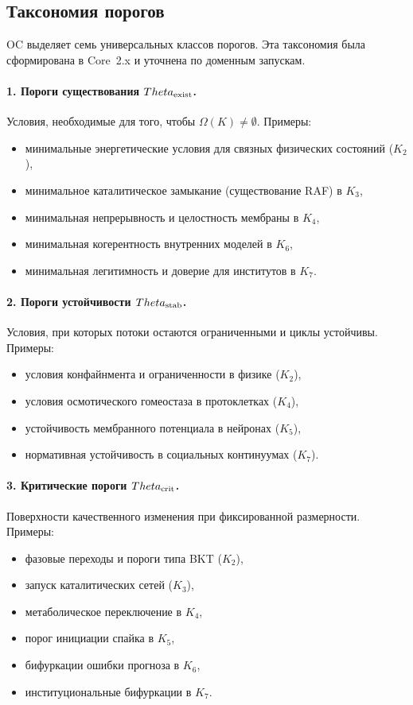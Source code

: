 \subsection{Таксономия порогов}

OC выделяет семь универсальных классов порогов. Эта таксономия была
сформирована в Core~2.x и уточнена по доменным запускам.

\paragraph{1. Пороги существования \(\Theta_{\rm exist}\).}
Условия, необходимые для того, чтобы \(\Omega(K)\neq\emptyset\).
Примеры:
\begin{itemize}
    \item минимальные энергетические условия для связных физических состояний (\(K_2\)),
    \item минимальное каталитическое замыкание (существование RAF) в \(K_3\),
    \item минимальная непрерывность и целостность мембраны в \(K_4\),
    \item минимальная когерентность внутренних моделей в \(K_6\),
    \item минимальная легитимность и доверие для институтов в \(K_7\).
\end{itemize}

\paragraph{2. Пороги устойчивости \(\Theta_{\rm stab}\).}
Условия, при которых потоки остаются ограниченными и циклы устойчивы.
Примеры:
\begin{itemize}
    \item условия конфайнмента и ограниченности в физике (\(K_2\)),
    \item условия осмотического гомеостаза в протоклетках (\(K_4\)),
    \item устойчивость мембранного потенциала в нейронах (\(K_5\)),
    \item нормативная устойчивость в социальных континуумах (\(K_7\)).
\end{itemize}

\paragraph{3. Критические пороги \(\Theta_{\rm crit}\).}
Поверхности качественного изменения при фиксированной размерности.
Примеры:
\begin{itemize}
    \item фазовые переходы и пороги типа BKT (\(K_2\)),
    \item запуск каталитических сетей (\(K_3\)),
    \item метаболическое переключение в \(K_4\),
    \item порог инициации спайка в \(K_5\),
    \item бифуркации ошибки прогноза в \(K_6\),
    \item институциональные бифуркации в \(K_7\).
\end{itemize}

